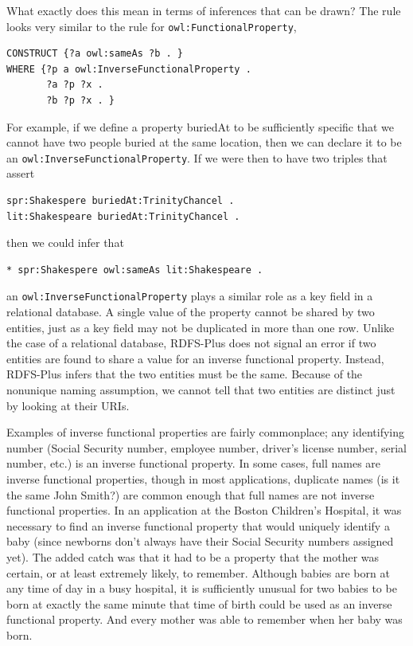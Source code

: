 What exactly does this mean in terms of inferences that can be drawn?
The rule looks very similar to the rule for \texttt{owl:FunctionalProperty},

\begin{lstlisting}
CONSTRUCT {?a owl:sameAs ?b . }
WHERE {?p a owl:InverseFunctionalProperty .
       ?a ?p ?x .
       ?b ?p ?x . }
\end{lstlisting}

For example, if we define a property buriedAt to be sufficiently
specific that we cannot have two people buried at the same location,
then we can declare it to be an \texttt{owl:InverseFunctionalProperty}. If we
were then to have two triples that assert

\begin{lstlisting}
spr:Shakespere buriedAt:TrinityChancel .
lit:Shakespeare buriedAt:TrinityChancel .
\end{lstlisting}

then we could infer that

\begin{lstlisting}
* spr:Shakespere owl:sameAs lit:Shakespeare .
\end{lstlisting}

an \texttt{owl:InverseFunctionalProperty} plays a similar role as a key field in
a relational database. A single value of the property cannot be shared
by two entities, just as a key field may not be
duplicated in more than one row. Unlike the case of a relational
database, RDFS-Plus does not signal an error if two entities are found
to share a value for an inverse functional property. Instead, RDFS-Plus
infers that the two entities must be the same. Because of the nonunique
naming assumption, we cannot tell that two entities are distinct just by
looking at their URIs.

Examples of inverse functional properties are fairly commonplace; any
identifying number (Social Security number, employee number, driver's
license number, serial number, etc.) is an inverse functional property.
In some cases, full names are inverse functional properties, though in
most applications, duplicate names (is it the same John Smith?) are
common enough that full names are not inverse functional properties. In
an application at the Boston Children's Hospital, it was necessary to
find an inverse functional property that would uniquely identify a baby
(since newborns don't always have their Social Security numbers assigned
yet). The added catch was that it had to be a property that the mother
was certain, or at least extremely likely, to remember. Although babies
are born at any time of day in a busy hospital, it is sufficiently
unusual for two babies to be born at exactly the same minute that time
of birth could be used as an inverse functional property. And every
mother was able to remember when her baby was born.


